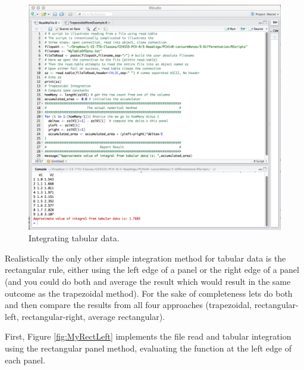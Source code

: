 \begin{figure}[h!] %
   \centering
   \includegraphics[width=6in]{./3-Differentation/MyTrapTab.jpg} 
   \caption{Integrating tabular data.}
   \label{fig:MyTrapTab}
\end{figure}

Realistically the only other simple integration method for tabular data is the rectangular rule, either using the left edge of a panel or the right edge of a panel (and you could do both and average the result which would result in the same outcome as the trapezoidal method).   For the sake of completeness lets do both and then compare the results from all four approaches (trapezoidal, rectangular-left, rectangular-right, average rectangular).

First, Figure \ref{fig:MyRectLeft} implements the file read and tabular integration using the rectangular panel method, evaluating the function at the left edge of each panel.

